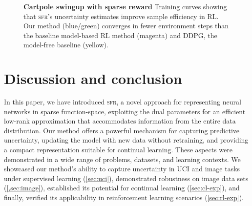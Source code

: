\documentclass{article}
\newcommand{\our}{\textsc{sfr}\xspace}
\newlength{\figurewidth}
\newlength{\figureheight}
\begin{document}
\begin{figure}[!t]
\begin{subfigure}[c]{.24\textwidth}
{\begin{tikzpicture}[inner sep=0,outer sep=0]
 \end{tikzpicture}}
 \end{subfigure}
 \hfill
 \begin{subfigure}[c]{.74\textwidth}
   \centering\scriptsize
   \setlength{\figurewidth}{\textwidth}
   \setlength{\figureheight}{.5\figurewidth}
   
 \end{subfigure}
 \hfill
 \caption{\textbf{Cartpole swingup with sparse reward} Training curves showing that \our's uncertainty estimates improve sample efficiency in RL.
   Our method (blue/green) converges in fewer environment steps than the baseline model-based RL method (magenta) and DDPG, the model-free baseline (yellow).}
 \label{fig:rl}
\end{figure}

%





\section{Discussion and conclusion}
\label{sec:conclusion}
%
In this paper, we have introduced \our, a novel approach for representing neural networks in sparse function-space, exploiting the dual parameters for an efficient low-rank approximation that accommodates information from the entire data distribution. Our method offers a powerful mechanism for capturing predictive uncertainty, updating the model with new data without retraining, and providing a compact representation suitable for continual learning. These aspects were demonstrated in a wide range of problems, datasets, and learning contexts. We showcased our method's ability to capture uncertainty in UCI and image tasks under supervised learning (\cref{sec:uci}), demonstrated robustness on image data sets (\cref{,sec:image}), established its potential for continual learning (\cref{sec:cl-exp}), and finally, verified its applicability in reinforcement learning scenarios (\cref{sec:rl-exp}).
\end{document}

